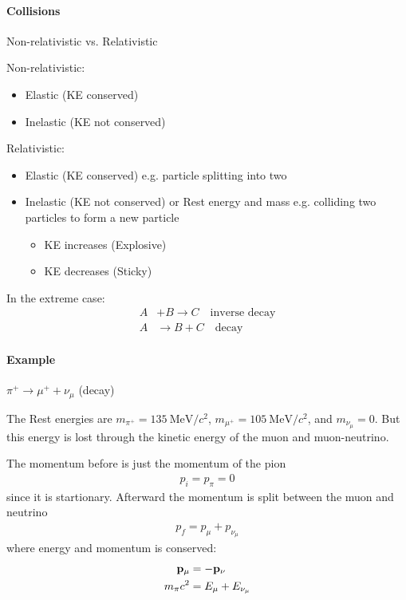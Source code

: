 \documentclass[../main.tex]{subfiles}
\begin{document}
\paragraph{Collisions} Non-relativistic vs. Relativistic

Non-relativistic:
\begin{itemize}
    \item Elastic (KE conserved)
    \item Inelastic (KE not conserved)
\end{itemize}
Relativistic:
\begin{itemize}
    \item Elastic (KE conserved) e.g. particle splitting into two
    \item Inelastic (KE not conserved) or Rest energy and mass e.g. colliding two particles to form
    a new particle
    \begin{itemize}
        \item KE increases (Explosive)
        \item KE decreases (Sticky)
    \end{itemize}
\end{itemize}
In the extreme case:
\begin{align*}
    A &+ B \rightarrow C \quad \textrm{inverse decay} \\
    A &\rightarrow B + C \quad \textrm{decay}
\end{align*}

\paragraph{Example} $\pi^+ \rightarrow \mu^+ + \nu_\mu$ (decay)

The Rest energies are $m_{\pi^+} = \qty{135}{\mega\electronvolt/c^2}$,
$m_{\mu^+} = \qty{105}{\mega\electronvolt/c^2}$, and $m_{\nu_\mu} = 0$. But this energy is lost
through the kinetic energy of the muon and muon-neutrino.

The momentum before is just the momentum of the pion
\begin{align*}
    p_i = p_{\pi} = 0
\end{align*}
since it is startionary. Afterward the momentum is split between the muon and neutrino
\begin{align*}
    p_f = p_{\mu} + p_{\nu_\mu}
\end{align*}
where energy and momentum is conserved:
\begin{align*}
    \vb{p}_\mu &= -\vb{p}_{\nu} \\
    m_{\pi} c^2 &= E_{\mu} + E_{\nu_\mu} 
\end{align*}
\end{document}
